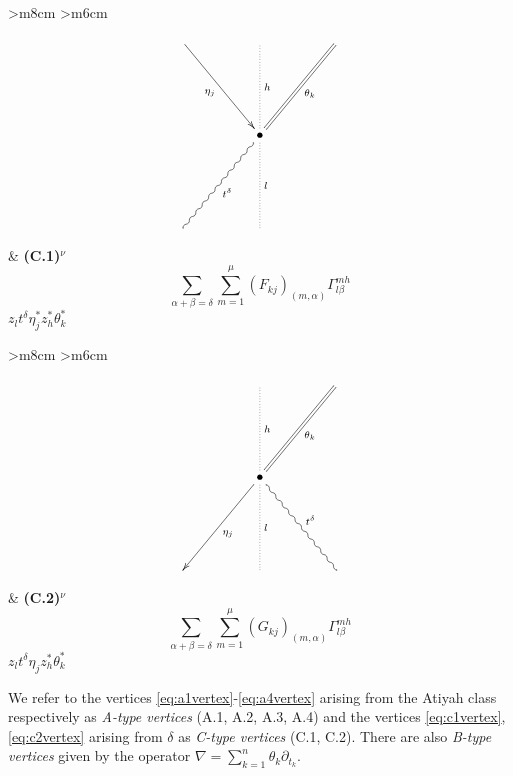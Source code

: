 \documentclass[english,letter paper,12pt,leqno]{article}
\theoremstyle{example}
\numberwithin{equation}{section}
\begin{document}
\begin{center}
\begin{tabular}{ >{\centering}m{8cm} >{\centering}m{6cm} }
\[
\xymatrix@C+2pc@R+3pc{
\ar[dr]_-{\eta_j} & \ar@{.}[d]^-{h} & \ar@{=}[dl]^-{\theta_k}\\
& \bullet \ar@{.}[d]^-{l} \ar@{~}[dl]^-{t^\delta}\\
& &
}
\]
&
\textbf{(C.1)${}^\nu$}
\vspace{1cm}
\[\sum_{\alpha + \beta = \delta } \sum_{m=1}^\mu (F_{kj})_{(m,\alpha)} \Gamma^{m h}_{l \beta}\]
\vspace{0.5cm}
$z_{l} t^\delta \eta_j^* z_h^* \theta_k^*$
\end{tabular}
\end{center}

\begin{center}
\begin{tabular}{ >{\centering}m{8cm} >{\centering}m{6cm} }
\[
\xymatrix@C+2pc@R+3pc{
& \ar@{.}[d]^-{h} & \ar@{=}[dl]^-{\theta_k} \\
& \bullet \ar[dl]^-{\eta_j}\ar@{.}[d]^-{l} \ar@{~}[dr]^-{t^\delta}\\
& &
}
\]
&
\textbf{(C.2)${}^\nu$}
\vspace{1cm}
\[\sum_{\alpha + \beta = \delta } \sum_{m=1}^\mu (G_{kj})_{(m,\alpha)} \Gamma^{m h}_{l \beta}\]
\vspace{0.5cm}
$z_{l} t^\delta \eta_j z_h^* \theta_k^*$
\end{tabular}
\end{center}

We refer to the vertices \eqref{eq:a1vertex}-\eqref{eq:a4vertex} arising from the Atiyah class respectively as \emph{A-type vertices} (A.1, A.2, A.3, A.4) and the vertices \eqref{eq:c1vertex},\eqref{eq:c2vertex} arising from $\delta$ as \emph{C-type vertices} (C.1, C.2). There are also \emph{B-type vertices} given by the operator $\nabla = \sum_{k=1}^n \theta_k \partial_{t_k}$.
\end{document}
